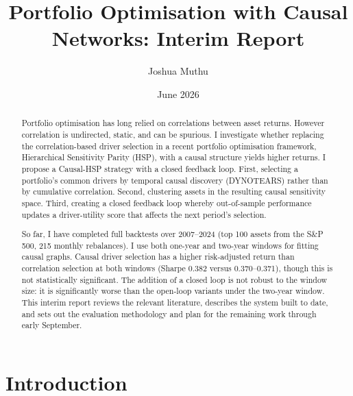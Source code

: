 \documentclass[12pt, a4paper]{report}
\title{Portfolio Optimisation with Causal Networks: Interim Report}
\author{Joshua Muthu}
\date{June 2026}
\begin{document}

\maketitle

\begin{abstract}
\noindent Portfolio optimisation has long relied on correlations between asset returns.
However correlation is undirected, static, and can be spurious.
I investigate whether replacing the correlation-based driver selection in a recent portfolio optimisation framework, 
Hierarchical Sensitivity Parity (HSP), with a causal structure yields higher returns.
I propose a Causal-HSP strategy with a closed feedback loop. First, selecting a portfolio's common drivers by temporal causal discovery
(DYNOTEARS) rather than by cumulative correlation. 
Second, clustering assets in the resulting causal sensitivity space. 
Third, creating a closed feedback loop whereby
out-of-sample performance updates a driver-utility score that affects the next period's selection.

So far, I have completed full backtests over 2007--2024 (top 100 assets from the S\&P 500, 215 monthly rebalances). I use both one-year and two-year windows for fitting causal graphs.
Causal driver selection has a higher risk-adjusted return than
correlation selection at both windows (Sharpe 0.382 versus
0.370--0.371), though this is not statistically significant.
The addition of a closed loop is not robust to the window size: it is
significantly worse than the open-loop variants under the two-year window.
This interim report reviews the
relevant literature, describes the system built to date, and sets out the evaluation methodology
and plan for the remaining work through early September.
\end{abstract}


\tableofcontents
\clearpage


\chapter{Introduction}
\end{document}
